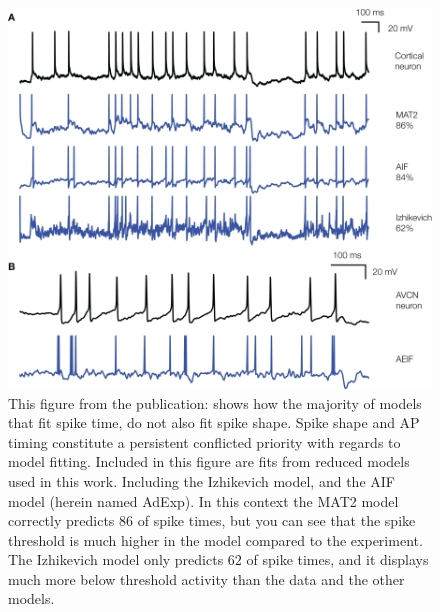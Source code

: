 \begin{figure}
    \centering
    \includegraphics[scale=5.0]{figures/IZHIkevich_fit_60Adexp_80.jpg}
    \caption[The spectrum of model fits]{This figure from the publication: \citep{rossant2011fitting} shows how the majority of models that fit spike time, do not also fit spike shape. Spike shape and AP timing constitute a persistent conflicted priority with regards to model fitting. Included in this figure are fits from reduced models used in this work. Including the Izhikevich model, and the AIF model (herein named AdExp). In this  context the MAT2 model correctly predicts $86$ of spike times, but you can see that the spike threshold is much higher in the model compared to the experiment. The Izhikevich model only predicts $62$ of spike times, and it displays much more below threshold activity than the data and the other models.} 
    \label{fig:my_label}
\end{figure}